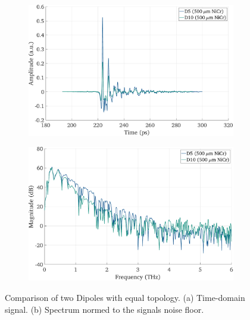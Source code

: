 \begin{figure}[!tbp]
    \centering
    \begin{subfigure}[b]{0.485\textwidth}
        \centering
        \includegraphics[width=\textwidth]{figures/Results/D5_D10/D5_D10_time.pdf}
        \caption{}
    \end{subfigure}
    \hfill
    \begin{subfigure}[b]{0.485\textwidth}
        \centering
        \includegraphics[width=\textwidth]{figures/Results/D5_D10/D5_D10_spectrum_nn.pdf}
        \caption{}
    \end{subfigure}
    \caption{Comparison of two Dipoles with equal topology. (a) Time-domain signal. (b) Spectrum normed to the signals noise floor.}
\end{figure}

